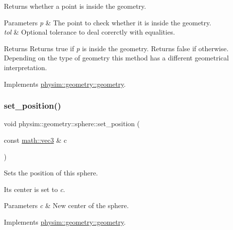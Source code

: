 Returns whether a point is inside the geometry. 


\begin{DoxyParams}{Parameters}
{\em p} & The point to check whether it is inside the geometry. \\
\hline
{\em tol} & Optional tolerance to deal corerctly with equalities. \\
\hline
\end{DoxyParams}
\begin{DoxyReturn}{Returns}
Returns true if {\itshape p} is inside the geometry. Returns false if otherwise. Depending on the type of geometry this method has a different geometrical interpretation. 
\end{DoxyReturn}


Implements \hyperlink{classphysim_1_1geometry_1_1geometry_a8ae67bba78a06e3c41b7f5b5903b897d}{physim\+::geometry\+::geometry}.

\mbox{\label{classphysim_1_1geometry_1_1sphere_a85a3364712fdd23409dcf2cb2e574d09}} 
\subsubsection{\texorpdfstring{set\+\_\+position()}{set\_position()}}
{\footnotesize\ttfamily void physim\+::geometry\+::sphere\+::set\+\_\+position (\begin{DoxyParamCaption}\item[{const \hyperlink{structphysim_1_1math_1_1vec3}{math\+::vec3} \&}]{c }\end{DoxyParamCaption})\hspace{0.3cm}{\ttfamily [virtual]}}



Sets the position of this sphere. 

Its center is set to {\itshape c}. 
\begin{DoxyParams}{Parameters}
{\em c} & New center of the sphere. \\
\hline
\end{DoxyParams}


Implements \hyperlink{classphysim_1_1geometry_1_1geometry_a45bffd27f5e8d59375762cf7987625e1}{physim\+::geometry\+::geometry}.

\mbox{\label{classphysim_1_1geometry_1_1sphere_a91fbdd869e305fa7497d71fa9c148039}} 
